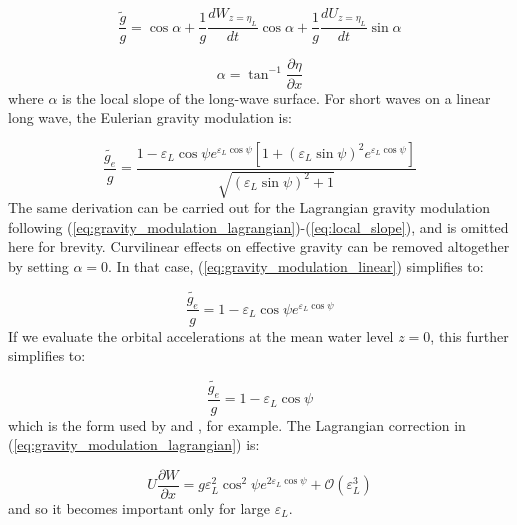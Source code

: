 \documentclass[lineno]{jfm}
\begin{document}
\begin{equation}
\label{eq:gravity_modulation_general}
\frac{\widetilde{g}}{g}
  = \cos{\alpha} 
  + \frac{1}{g} \dfrac{dW_{z=\eta_L}}{dt} \cos{\alpha}
  + \frac{1}{g} \dfrac{dU_{z=\eta_L}}{dt} \sin{\alpha}
\end{equation}

\begin{equation}
\label{eq:local_slope}
\alpha = \tan^{-1}{\dfrac{\partial \eta}{\partial x}}
\end{equation}
where $\alpha$ is the local slope of the long-wave surface.
For short waves on a linear long wave, the Eulerian gravity modulation is:

\begin{equation}
\label{eq:gravity_modulation_linear}
\frac{\widetilde{g_e}}{g}
  = 
  \frac{
    1 - \varepsilon_L \cos{\psi} e^{\varepsilon_L \cos{\psi}}
    \left[ 1 + \left(\varepsilon_L \sin{\psi}\right)^2 e^{\varepsilon_L \cos{\psi}} \right]
  }
  {\sqrt{\left(\varepsilon_L \sin{\psi}\right)^2 + 1}}
\end{equation}
The same derivation can be carried out for the Lagrangian gravity
modulation following (\ref{eq:gravity_modulation_lagrangian})-(\ref{eq:local_slope}),
and is omitted here for brevity.
Curvilinear effects on effective gravity can be removed altogether by setting
$\alpha = 0$.
In that case, (\ref{eq:gravity_modulation_linear}) simplifies to:

\begin{equation}
\label{eq:gravity_modulation_linear_no_curvature}
\frac{\widetilde{g_e}}{g} = 1 - \varepsilon_L \cos{\psi} e^{\varepsilon_L \cos{\psi}}
\end{equation}
If we evaluate the orbital accelerations at the mean water level $z=0$,
this further simplifies to:

\begin{equation}
\label{eq:gravity_modulation_linear_no_curvature_mean_level}
\frac{\widetilde{g_e}}{g} = 1 - \varepsilon_L \cos{\psi}
\end{equation}
which is the form used by \citet{longuet1960changes} and
\citet{peureux2021unsteady}, for example.
The Lagrangian correction in (\ref{eq:gravity_modulation_lagrangian}) is:

\begin{equation}
\label{eq:gravity_modulation_lagrangian_correction}
U \frac{\partial W}{\partial x} = g \varepsilon_L^2 \cos^2{\psi} e^{2 \varepsilon_L \cos{\psi}}
+ \mathcal{O}(\varepsilon_L^3)
\end{equation}
and so it becomes important only for large $\varepsilon_L$.
\end{document}
